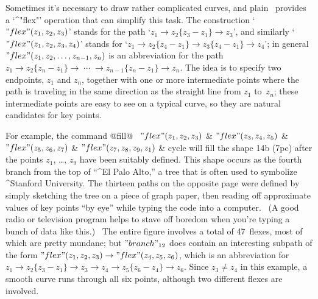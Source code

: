{{{{Sometimes it's necessary to draw rather complicated curves, and plain \MF\
provides a `^"flex"' operation that can simplify this task. The
construction `$"flex"(z_1,z_2,z_3)$' stands for the path
`$z_1\to z_2\{z_3-z_1\}\to z_3$',
and similarly `$"flex"(z_1,z_2,z_3,z_4)$' stands for
`$z_1\to z_2\{z_4-z_1\}\to z_3\{z_4-z_1\}\to z_4$'; in general
\begindisplay
$"flex"(z_1,z_2,\ldots,z_{n-1},z_n)$
\enddisplay
is an abbreviation for the path
\begindisplay
$z_1\to z_2\{z_n-z_1\}\to\;\cdots\;\to z_{n-1}\{z_n-z_1\}\to z_n$.
\enddisplay
The idea is to specify two endpoints, $z_1$ and $z_n$, together with
one or more intermediate points where the path is traveling in the
same direction as the straight line from $z_1$ to~$z_n$; these
intermediate points are easy to see on a typical curve, so they
are natural candidates for key points.

For example, the command
\begindisplay
@fill@ \ $"flex"(z_1,z_2,z_3)$ \& $"flex"(z_3,z_4,z_5)$\cr
\indent\& $"flex"(z_5,z_6,z_7)$ \& $"flex"(z_7,z_8,z_9,z_1)$ \& cycle\cr
\enddisplay
will fill the shape
\displayfig 14b (7pc)
after the points $z_1$, \dots, $z_9$ have been suitably defined. This
shape occurs as the fourth branch from the top of ``^{El Palo Alto},''
a tree that is often used to symbolize ^{Stanford University}. The thirteen
paths on the opposite page were defined by simply sketching the tree on
a piece of graph paper, then reading off approximate values of key
points ``by eye'' while typing the code into a computer. \ (A good radio
or television program helps to stave off boredom when you're typing
a bunch of data like this.) \ The entire
figure involves a total of 47~flexes, most of which are pretty mundane;
but $"branch"_{12}$ does contain an interesting subpath of the form
\begindisplay
$"flex"(z_1,z_2,z_3)\to"flex"(z_4,z_5,z_6)$,
\enddisplay
which is an abbreviation for
\begindisplay
$z_1\to z_2\{z_3-z_1\}\to z_3\to z_4\to z_5\{z_6-z_4\}\to z_6$.
\enddisplay
Since $z_3\ne z_4$ in this example, a smooth curve runs through all six
points, although two different flexes are involved.

}}}}
